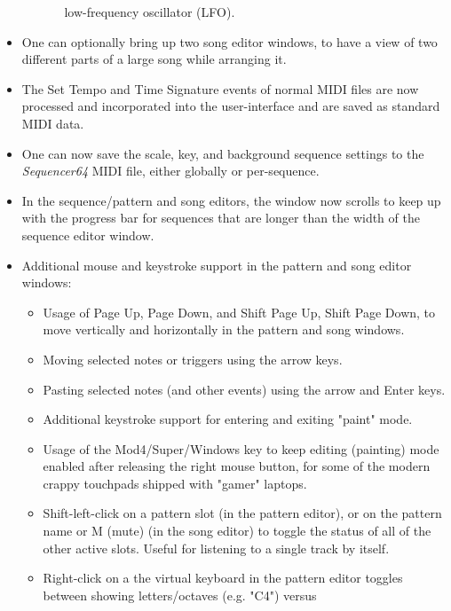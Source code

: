 \documentclass[
 11pt,
 twoside,
 a4paper,
 headinclude,
 footinclude,
 final                                 %
]{article}
\begin{document}
\begin{itemize}
\begin{itemize}
\begin{itemize}
               low-frequency oscillator (LFO).
         \end{itemize}
      \end{itemize}
      \item One can optionally bring up two song editor windows, to have a view
         of two different parts of a large song while arranging it.
      \item The Set Tempo and Time Signature events of normal MIDI files are
         now processed and incorporated into the user-interface and are saved
         as standard MIDI data.
      \item One can now save the scale, key, and background sequence
         settings to the \textsl{Sequencer64} MIDI file, either globally or
         per-sequence.
      \item In the sequence/pattern and song editors, the window now scrolls to
         keep up with the progress bar for sequences that are longer than the
         width of the sequence editor window.
      \item Additional mouse and keystroke support in the pattern and song
         editor windows:
      \begin{itemize}
         \item Usage of Page Up, Page Down, and Shift Page Up, Shift Page Down,
            to move vertically and horizontally in the pattern and song
            windows.
         \item Moving selected notes or triggers using the arrow keys.
         \item Pasting selected notes (and other events) using the arrow and
            Enter keys.
         \item Additional keystroke support for entering and exiting "paint"
            mode.
         \item Usage of the Mod4/Super/Windows key to keep editing
            (painting) mode enabled after releasing the right mouse button, for
            some of the modern crappy touchpads shipped with "gamer" laptops.
         \item Shift-left-click on a pattern slot (in the pattern editor),
            or on the pattern name or M (mute) (in the song editor)
            to toggle the status of all of the other active slots.
            Useful for listening to a single track by itself.
         \item Right-click on a the virtual keyboard in the pattern editor
            toggles between showing letters/octaves (e.g. "C4") versus

\end{itemize}
\end{itemize}
\end{document}
